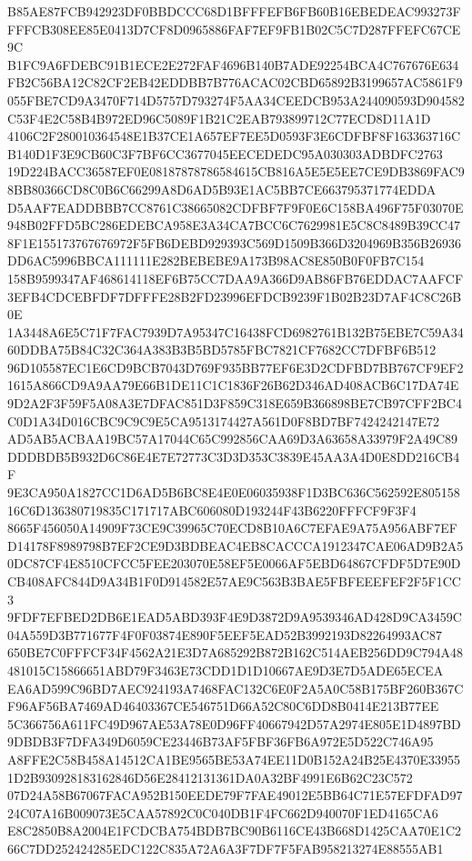 \documentclass[UTF8,fontset=fandol,zihao=-4,a4paper]{ctexart}
\begin{document}
{{B85AE87FCB942923DF0BBDCCC68D1BFFFEFB6FB60B16EBEDEAC993273FFFFCB308EE85E0413D7CF8D0965886FAF7EF9FB1B02C5C7D287FFEFC67CE9C
B1FC9A6FDEBC91B1ECE2E272FAF4696B140B7ADE92254BCA4C767676E634FB2C56BA12C82CF2EB42EDDBB7B776ACAC02CBD65892B3199657AC5861F9
055FBE7CD9A3470F714D5757D793274F5AA34CEEDCB953A244090593D904582C53F4E2C58B4B972ED96C5089F1B21C2EAB793899712C77ECD8D11A1D
4106C2F280010364548E1B37CE1A657EF7EE5D0593F3E6CDFBF8F163363716CB140D1F3E9CB60C3F7BF6CC3677045EECEDEDC95A030303ADBDFC2763
19D224BACC36587EF0E08187878786584615CB816A5E5E5EE7CE9DB3869FAC98BB80366CD8C0B6C66299A8D6AD5B93E1AC5BB7CE663795371774EDDA
D5AAF7EADDBBB7CC8761C38665082CDFBF7F9F0E6C158BA496F75F03070E948B02FFD5BC286EDEBCA958E3A34CA7BCC6C7629981E5C8C8489B39CC47
8F1E155173767676972F5FB6DEBD929393C569D1509B366D3204969B356B26936DD6AC5996BBCA111111E282BEBEBE9A173B98AC8E850B0F0FB7C154
158B9599347AF468614118EF6B75CC7DAA9A366D9AB86FB76EDDAC7AAFCF3EFB4CDCEBFDF7DFFFE28B2FD23996EFDCB9239F1B02B23D7AF4C8C26B0E
1A3448A6E5C71F7FAC7939D7A95347C16438FCD6982761B132B75EBE7C59A3460DDBA75B84C32C364A383B3B5BD5785FBC7821CF7682CC7DFBF6B512
96D105587EC1E6CD9BCB7043D769F935BB77EF6E3D2CDFBD7BB767CF9EF21615A866CD9A9AA79E66B1DE11C1C1836F26B62D346AD408ACB6C17DA74E
9D2A2F3F59F5A08A3E7DFAC851D3F859C318E659B366898BE7CB97CFF2BC4C0D1A34D016CBC9C9C9E5CA9513174427A561D0F8BD7BF7424242147E72
AD5AB5ACBAA19BC57A17044C65C992856CAA69D3A63658A33979F2A49C89DDDBDB5B932D6C86E4E7E72773C3D3D353C3839E45AA3A4D0E8DD216CB4F
9E3CA950A1827CC1D6AD5B6BC8E4E0E06035938F1D3BC636C562592E80515816C6D136380719835C171717ABC606080D193244F43B6220FFFCF9F3F4
8665F456050A14909F73CE9C39965C70ECD8B10A6C7EFAE9A75A956ABF7EFD14178F8989798B7EF2CE9D3BDBEAC4EB8CACCCA1912347CAE06AD9B2A5
0DC87CF4E8510CFCC5FEE203070E58EF5E0066AF5EBD64867CFDF5D7E90DCB408AFC844D9A34B1F0D914582E57AE9C563B3BAE5FBFEEEFEF2F5F1CC3
9FDF7EFBED2DB6E1EAD5ABD393F4E9D3872D9A9539346AD428D9CA3459C04A559D3B771677F4F0F03874E890F5EEF5EAD52B3992193D82264993AC87
650BE7C0FFFCF34F4562A21E3D7A685292B872B162C514AEB256DD9C794A48481015C15866651ABD79F3463E73CDD1D1D10667AE9D3E7D5ADE65ECEA
EA6AD599C96BD7AEC924193A7468FAC132C6E0F2A5A0C58B175BF260B367CF96AF56BA7469AD46403367CE546751D66A52C80C6DD8B0414E213B77EE
5C366756A611FC49D967AE53A78E0D96FF40667942D57A2974E805E1D4897BD9DBDB3F7DFA349D6059CE23446B73AF5FBF36FB6A972E5D522C746A95
A8FFE2C58B458A14512CA1BE9565BE53A74EE11D0B152A24B25E4370E339551D2B930928183162846D56E28412131361DA0A32BF4991E6B62C23C572
07D24A58B67067FACA952B150EEDE79F7FAE49012E5BB64C71E57EFDFAD9724C07A16B009073E5CAA57892C0C040DB1F4FC662D940070F1ED4165CA6
E8C2850B8A2004E1FCDCBA754BDB7BC90B6116CE43B668D1425CAA70E1C266C7DD252424285EDC122C835A72A6A3F7DF7F5FAB958213274E88555AB1
}}
\end{document}
